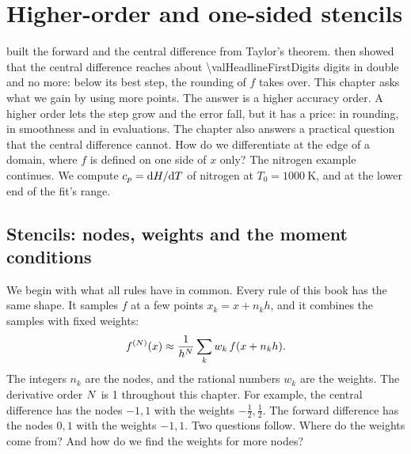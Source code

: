 \chapter{Higher-order and one-sided stencils}\label{ch:stencils}

 built the forward and the central difference from Taylor's theorem.  then showed
that the central difference reaches about \num{\valHeadlineFirstDigits} digits in double and no more: below its best
step, the rounding of $f$ takes over. This chapter asks what we gain by using more points. The answer is a higher
accuracy order. A higher order lets the step grow and the error fall, but it has a price: in rounding, in smoothness
and in evaluations. The chapter also answers a practical question that the central difference cannot. How do we
differentiate at the edge of a domain, where $f$ is defined on one side of $x$ only? The nitrogen example continues.
We compute $c_p = \mathrm{d} H / \mathrm{d} T$ of nitrogen at $T_0 = \SI{1000}{\kelvin}$, and at the lower end of the fit's
range.

\section{Stencils: nodes, weights and the moment conditions}\label{sec:stencils-moments}

We begin with what all rules have in common. Every rule of this book has the same shape. It samples $f$ at a few
points $x_k = x + n_k h$, and it combines the samples with fixed weights:
\begin{equation}
  f^{(N)}(x) \approx \frac{1}{h^{N}} \sum_k w_k\, f(x + n_k h).
  \label{eq:stencils-rule}
\end{equation}
The integers $n_k$ are the nodes, and the
rational numbers $w_k$ are the weights. The derivative order $N$ is 1 throughout this chapter. For example, the
central difference has the nodes $-1, 1$ with the weights $-\tfrac12, \tfrac12$. The forward difference has the
nodes $0, 1$ with the weights $-1, 1$. Two questions follow. Where do the weights come from? And how do we find the
weights for more nodes?

